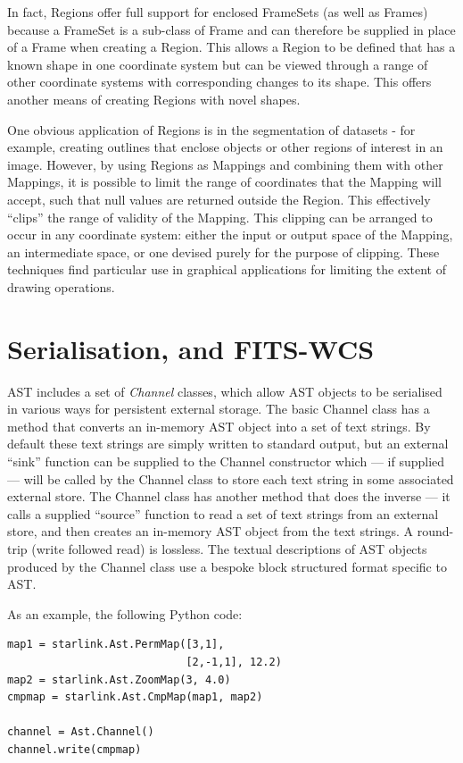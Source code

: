 \documentclass[final,authoryear,5p,times,twocolumn]{elsarticle}
\begin{document}
In fact, Regions offer full support for enclosed FrameSets (as well as
Frames) because a FrameSet is a sub-class of Frame and can therefore be
supplied in place of a Frame when creating a Region. This allows a Region
to be defined that has a known shape in one coordinate system but can be
viewed through a range of other coordinate systems with corresponding
changes to its shape. This offers another means of creating Regions with
novel shapes.

One obvious application of Regions is in the segmentation of datasets -
for example, creating outlines that enclose objects or other regions of
interest in an image. However, by using Regions as Mappings and combining
them with other Mappings, it is possible to limit the range of
coordinates that the Mapping will accept, such that null values are
returned outside the Region. This effectively ``clips'' the range of
validity of the Mapping. This clipping can be arranged to occur in any
coordinate system: either the input or output space of the Mapping, an
intermediate space, or one devised purely for the purpose of clipping.
These techniques find particular use in graphical applications for
limiting the extent of drawing operations.

\section{Serialisation, and FITS-WCS}
AST includes a set of \emph{Channel} classes, which allow AST objects to
be serialised in various ways for persistent external storage. The basic
Channel class has a method that converts an in-memory AST object into a set
of text strings. By default
these text strings are simply written to standard output, but an external
``sink'' function can be supplied to the Channel constructor which --- if
supplied --- will be called by the Channel class to store each text
string in some associated external store. The Channel class has another
method that does the inverse --- it calls a supplied ``source''
function to read a set of text strings from an external store, and then
creates an in-memory AST object from the text strings. A round-trip
(write followed read) is lossless. The textual descriptions of
AST objects produced by the Channel class use a bespoke block structured
format specific to AST.

As an example, the following Python code:

\begin{lstlisting}
map1 = starlink.Ast.PermMap([3,1],
                            [2,-1,1], 12.2)
map2 = starlink.Ast.ZoomMap(3, 4.0)
cmpmap = starlink.Ast.CmpMap(map1, map2)

channel = Ast.Channel()
channel.write(cmpmap)
\end{lstlisting}
\end{document}
